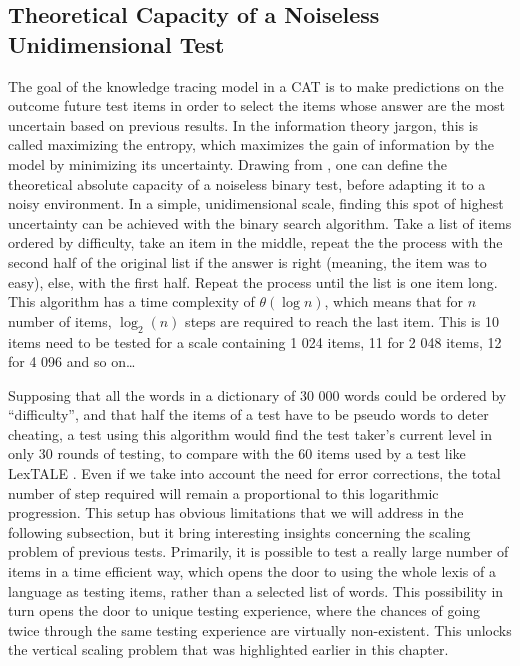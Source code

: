     \subsection{Theoretical Capacity of a Noiseless Unidimensional Test}
The goal of the knowledge tracing model in a CAT is to make predictions on the outcome future test items in order to select the items whose answer are the most uncertain based on previous results. In the information theory jargon, this is called maximizing the entropy, which maximizes the gain of information by the model by minimizing its uncertainty. Drawing from \textcite{shannon_mathematical_1948}, one can define the theoretical absolute capacity of a noiseless binary test, before adapting it to a noisy environment. In a simple, unidimensional scale, finding this spot of highest uncertainty can be achieved with the binary search algorithm. Take a list of items ordered by difficulty, take an item in the middle, repeat the the process with the second half of the original list if the answer is right (meaning, the item was to easy), else, with the first half. Repeat the process until the list is one item long. This algorithm has a time complexity of $\theta(\log{n})$, which means that for $n$ number of items, $\log_2(n)$ steps are required to reach the last item. This is 10 items need to be tested for a scale containing 1 024 items, 11 for 2 048 items, 12 for 4 096 and so on\ldots

Supposing that all the words in a dictionary of 30 000 words could be ordered by ``difficulty'', and that half the items of a test have to be pseudo words to deter cheating, a test using this algorithm would find the test taker's current level in only 30 rounds of testing, to compare with the 60 items used by a test like LexTALE \parencite{lemhofer_introducing_2012}. Even if we take into account the need for error corrections, the total number of step required will remain a proportional to this logarithmic progression. This setup has obvious limitations that we will address in the following subsection, but it bring interesting insights concerning the scaling problem of previous tests. Primarily, it is possible to test a really large number of items in a time efficient way, which opens the door to using the whole lexis of a language as testing items, rather than a selected list of words. This possibility in turn opens the door to unique testing experience, where the chances of going twice through the same testing experience are virtually non-existent. This unlocks the vertical scaling problem that was highlighted earlier in this chapter.

